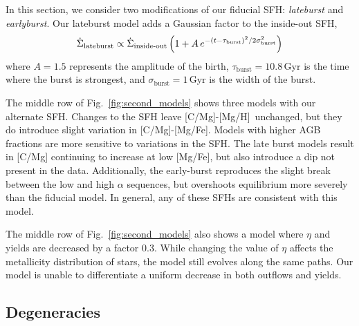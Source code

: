 \documentclass[fleqn,
usenatbib]{mnras}
\newcommand{\agb}{AGB}
\newcommand{\sfh}{SFH} %
\newcommand{\caah}{[C/Mg]-[Mg/H]}
\newcommand{\caafe}{[C/Mg]-[Mg/Fe]}
\begin{document}
In this section, we consider two modifications of our fiducial \sfh{}: \textit{lateburst} and \textit{earlyburst}.
Our lateburst model adds a Gaussian factor to the inside-out \sfh{},
\begin{equation}\label{eq:lateburst}
    \dot{\Sigma}_\text{lateburst} \propto \dot{\Sigma}_\text{inside-out} \left(1 + A\,e^{-(t-\tau_{\rm burst})^2/2\sigma^2_{\rm burst}} \right)
\end{equation}
where $A=1.5$ represents the amplitude of the birth, $\tau_\text{burst}=10.8$\,Gyr is the time where the burst is strongest, and $\sigma_\text{burst}=1$\,Gyr is the width of the burst.

The middle row of Fig.~\ref{fig:second_models} shows three models with our alternate \sfh{}. Changes to the \sfh{} leave \caah\ unchanged, but they do introduce slight variation in \caafe. Models with higher \agb{} fractions are more sensitive to variations in the \sfh{}. The late burst models result in [C/Mg] continuing to increase at low [Mg/Fe], but also introduce a dip not present in the data. Additionally, the early-burst
reproduces the slight break between the low and high $\alpha$ sequences, but overshoots equilibrium more severely than the fiducial model. 
In general, any of these \sfh{}s are consistent with this model.

The middle row of Fig.~\ref{fig:second_models} also shows a model where $\eta$ and yields are decreased by a factor 0.3. While changing the value of $\eta$ affects the metallicity distribution of stars, the model still evolves along the same paths. Our model is unable to differentiate a uniform decrease in both outflows and yields.


\subsection{Degeneracies} \label{sec:outflows}
\end{document}
